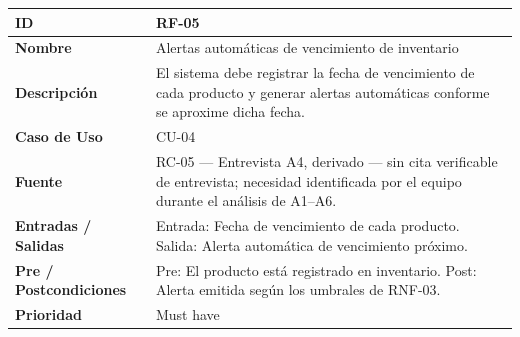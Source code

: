 \documentclass[
]{article}
\newcounter{none} %
\begin{document}
{\def\LTcaptype{none} %
\begin{longtable}[]{|
  >{\raggedright\arraybackslash}p{}|
  >{\raggedright\arraybackslash}p{}|}
\hline
\begin{minipage}[b]{\linewidth}\raggedright
\textbf{ID}
\end{minipage} & \begin{minipage}[b]{\linewidth}\raggedright
RF-05
\end{minipage} \\
\hline
\endhead
\hline
\endlastfoot
\textbf{Nombre} & \begin{minipage}[t]{\linewidth}\raggedright
Alertas automáticas de vencimiento de inventario
\end{minipage} \\
\hline
\textbf{Descripción} & \begin{minipage}[t]{\linewidth}\raggedright
El sistema debe registrar la fecha de vencimiento de cada producto y generar alertas automáticas conforme se aproxime dicha fecha.
\end{minipage} \\
\hline
\textbf{Caso de Uso} & \begin{minipage}[t]{\linewidth}\raggedright
CU-04
\end{minipage} \\
\hline
\textbf{Fuente} & \begin{minipage}[t]{\linewidth}\raggedright
RC-05 — Entrevista A4, derivado — sin cita verificable de entrevista; necesidad identificada por el equipo durante el análisis de A1–A6.
\end{minipage} \\
\hline
\textbf{Entradas / Salidas} & \begin{minipage}[t]{\linewidth}\raggedright
Entrada: Fecha de vencimiento de cada producto. Salida: Alerta automática de vencimiento próximo.
\end{minipage} \\
\hline
\textbf{Pre / Postcondiciones} & \begin{minipage}[t]{\linewidth}\raggedright
Pre: El producto está registrado en inventario. Post: Alerta emitida según los umbrales de RNF-03.
\end{minipage} \\
\hline
\textbf{Prioridad} & \begin{minipage}[t]{\linewidth}\raggedright
Must have
\end{minipage} \\

\end{longtable}}
\end{document}
